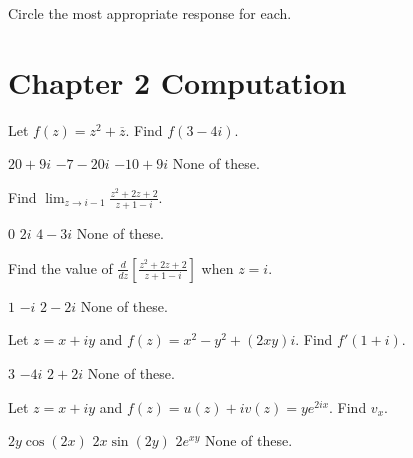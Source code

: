 \documentclass[13pt]{exam}
\begin{document}
\begin{center}
\end{center}
\vspace{0.1in}

\vspace{12pt}

\vspace{1em}

Circle the most appropriate response for each.

\section*{Chapter 2 Computation}

\begin{questions}

\setcounter{question}{0}

\question Let \(f(z)=z^2+\overline{z}\). Find \(f(3-4i)\).
\begin{choices}
\choice \(20+9i\)
\choice \(-7-20i\)
\choice \(-10+9i\)
\choice None of these. 
\end{choices}

\question Find \(\displaystyle\lim_{z\to i-1}\frac{z^2+2z+2}{z+1-i}\). 
\begin{choices}
\choice \(0\)
\choice \(2i\)
\choice \(4-3i\)
\choice None of these. 
\end{choices}

\question Find the value of \(\frac{d}{dz}\left[\frac{z^2+2z+2}{z+1-i}\right]\)
when \(z=i\). 
\begin{choices}
\choice \(1\)
\choice \(-i\)
\choice \(2-2i\)
\choice None of these. 
\end{choices}

\question Let \(z=x+iy\) and \(f(z)=x^2-y^2+(2xy)i\). Find \(f'(1+i)\). 
\begin{choices}
\choice \(3\)
\choice \(-4i\)
\choice \(2+2i\)
\choice None of these. 
\end{choices}

\question Let \(z=x+iy\) and \(f(z)=u(z)+iv(z)=ye^{2ix}\). Find \(v_x\).
\begin{choices}
\choice \(2y\cos(2x)\)
\choice \(2x\sin(2y)\)
\choice \(2e^{xy}\)
\choice None of these. 
\end{choices}
\end{questions}
\end{document}
